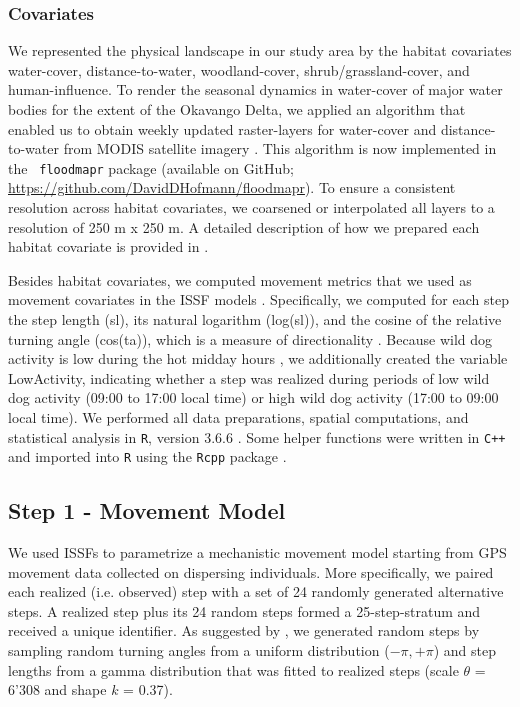 \documentclass[abstract=on,10pt,a4paper,bibliography=totocnumbered]{article}
\begin{document}
\subsubsection{Covariates}
We represented the physical landscape in our study area by the habitat
covariates \textsf{water-cover, distance-to-water, woodland-cover,
shrub/grassland-cover, and human-influence}. To render the seasonal dynamics in
water-cover of major water bodies for the extent of the Okavango Delta, we
applied an algorithm that enabled us to obtain weekly updated raster-layers for
\textsf{water-cover} and \textsf{distance-to-water} from MODIS satellite imagery
\citep{Wolski.2017, Hofmann.2021}. This algorithm is now implemented in the {\tt
floodmapr} package (available on GitHub;
\url{https://github.com/DavidDHofmann/floodmapr}). To ensure a consistent
resolution across habitat covariates, we coarsened or interpolated all layers to
a resolution of 250 m x 250 m. A detailed description of how we prepared each
habitat covariate is provided in \cite{Hofmann.2021}.

Besides habitat covariates, we computed movement metrics that we used as
movement covariates in the ISSF models \citep{Avgar.2016, Fieberg.2021}.
Specifically, we computed for each step the step length (\textsf{sl}), its
natural logarithm (\textsf{log(sl)}), and the cosine of the relative turning
angle (\textsf{cos(ta)}), which is a measure of directionality
\citep{Turchin.1998}. Because wild dog activity is low during the hot midday
hours \citep{Cozzi.2012}, we additionally created the variable
\textsf{LowActivity}, indicating whether a step was realized during periods of
low wild dog activity (09:00 to 17:00 local time) or high wild dog activity
(17:00 to 09:00 local time). We performed all data preparations, spatial
computations, and statistical analysis in {\tt R}, version 3.6.6 \citep{R.2020}.
Some helper functions were written in {\tt C++} and imported into {\tt R} using
the {\tt Rcpp} package \citep{Eddelbuettel.2011, Eddelbuettel.2013}.

\subsection{Step 1 - Movement Model}
We used ISSFs \citep{Avgar.2016} to parametrize a mechanistic movement model
starting from GPS movement data collected on dispersing individuals. More
specifically, we paired each realized (i.e. observed) step with a set of 24
randomly generated alternative steps. A realized step plus its 24 random steps
formed a 25-step-stratum and received a unique identifier. As suggested by
\cite{Avgar.2016}, we generated random steps by sampling random turning angles
from a uniform distribution (\(-\pi, +\pi\)) and step lengths from a gamma
distribution that was fitted to realized steps (scale \(\theta\) = 6'308 and
shape \(k\) = 0.37).
\end{document}
